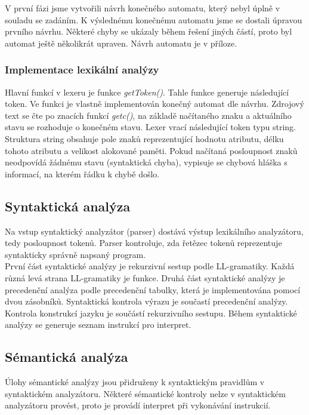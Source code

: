 \documentclass[11pt,a4paper,titlepage]{article}
\begin{document}
	
		\hspace{1cm}  V první fázi jsme vytvořili návrh konečného automatu, který nebyl úplně v souladu se zadáním. K výslednému konečnému automatu jsme se dostali úpravou prvního návrhu. Některé chyby se ukázaly během řešení jiných částí, proto byl automat ještě několikrát upraven. Návrh automatu je v příloze.
	\bigskip
	\smallskip
		
	\subsubsection{Implementace lexikální analýzy}
	\bigskip
		\hspace{1cm} Hlavní funkcí v lexeru je funkce \emph{getToken()}. Tahle funkce generuje následující token. Ve funkci je vlastně implementován konečný automat dle návrhu. Zdrojový text se čte po znacích funkcí \emph{getc()}, na základě načítaného znaku a aktuálního stavu se rozhoduje o konečném stavu. Lexer vrací následující token typu string. Struktura string obsahuje pole znaků reprezentující hodnotu atributu, délku tohoto atributu a velikost alokované paměti. Pokud načítaná posloupnost znaků neodpovídá žádnému stavu (syntaktická chyba), vypisuje se chybová hláška s informací, na kterém řádku k chybě došlo.
  \smallskip
	\bigskip

	\subsection{Syntaktická analýza}
	\bigskip
   	\hspace{1cm} Na vstup syntaktický analyzátor (parser) dostává výstup lexikálního analyzátoru, tedy posloupnost tokenů. Parser kontroluje, zda řetězec tokenů reprezentuje syntakticky správně napsaný program. \\
   	\hspace{1cm} První část syntaktické analýzy je rekurzivní sestup podle LL-gramatiky. Každá různá levá strana LL-gramatiky je funkce. Druhá část syntaktické analýzy je precedenční analýza podle precedenční tabulky, která je implementována pomocí dvou zásobníků. Syntaktická kontrola výrazu je součastí precedenční analýzy. Kontrola konstrukcí jazyku je součástí rekurzivního sestupu. Během syntaktické analýzy se generuje seznam instrukcí pro interpret.
	 \bigskip
	 \smallskip
	 
	\subsection{Sémantická analýza}
	\bigskip
   	\hspace{1cm} Úlohy sémantické analýzy jsou přidruženy k syntaktickým pravidlům v syntaktickém analyzátoru. Některé sémantické kontroly nelze v syntaktickém analyzátoru provést, proto je provádí interpret při vykonávání instrukcií.
\end{document}

